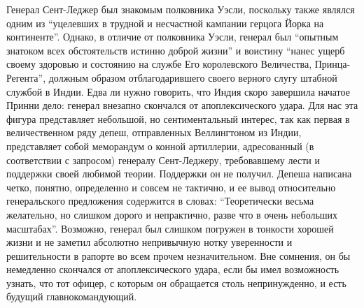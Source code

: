 \documentclass[
  oneside,
  12pt,
  titlepage]{book}
\begin{document}
Генерал Сент-Леджер был знакомым полковника Уэсли, поскольку также являлся одним из ``уцелевших в трудной и несчастной кампании герцога Йорка на континенте''. Однако, в отличие от полковника Уэсли, генерал был ``опытным знатоком всех обстоятельств истинно доброй жизни'' и воистину ``нанес ущерб своему здоровью и состоянию на службе Его королевского Величества, Принца-Регента'', должным образом отблагодарившего своего верного слугу штабной службой в Индии. Едва ли нужно говорить, что Индия скоро завершила начатое Принни дело: генерал внезапно скончался от апоплексического удара. Для нас эта фигура представляет небольшой, но сентиментальный интерес, так как первая в величественном ряду депеш, отправленных Веллингтоном из Индии, представляет собой меморандум о конной артиллерии, адресованный (в соответствии с запросом) генералу Сент-Леджеру, требовавшему лести и поддержки своей любимой теории. Поддержки он не получил. Депеша написана четко, понятно, определенно и совсем не тактично, и ее вывод относительно генеральского предложения содержится в словах: ``Теоретически весьма желательно, но слишком дорого и непрактично, разве что в очень небольших масштабах''. Возможно, генерал был слишком погружен в тонкости хорошей жизни и не заметил абсолютно непривычную нотку уверенности и решительности в рапорте во всем прочем незначительном. Вне сомнения, он бы немедленно скончался от апоплексического удара, если бы имел возможность узнать, что тот офицер, с которым он обращается столь непринужденно, и есть будущий главнокомандующий.
\end{document}
